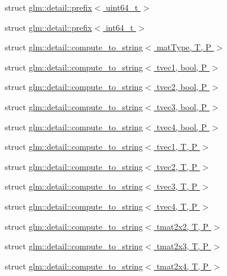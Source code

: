 \begin{DoxyCompactItemize}
struct \hyperlink{structglm_1_1detail_1_1prefix_3_01uint64__t_01_4}{glm\-::detail\-::prefix$<$ uint64\-\_\-t $>$}
\item 
struct \hyperlink{structglm_1_1detail_1_1prefix_3_01int64__t_01_4}{glm\-::detail\-::prefix$<$ int64\-\_\-t $>$}
\item 
struct \hyperlink{structglm_1_1detail_1_1compute__to__string}{glm\-::detail\-::compute\-\_\-to\-\_\-string$<$ mat\-Type, T, P $>$}
\item 
struct \hyperlink{structglm_1_1detail_1_1compute__to__string_3_01tvec1_00_01bool_00_01P_01_4}{glm\-::detail\-::compute\-\_\-to\-\_\-string$<$ tvec1, bool, P $>$}
\item 
struct \hyperlink{structglm_1_1detail_1_1compute__to__string_3_01tvec2_00_01bool_00_01P_01_4}{glm\-::detail\-::compute\-\_\-to\-\_\-string$<$ tvec2, bool, P $>$}
\item 
struct \hyperlink{structglm_1_1detail_1_1compute__to__string_3_01tvec3_00_01bool_00_01P_01_4}{glm\-::detail\-::compute\-\_\-to\-\_\-string$<$ tvec3, bool, P $>$}
\item 
struct \hyperlink{structglm_1_1detail_1_1compute__to__string_3_01tvec4_00_01bool_00_01P_01_4}{glm\-::detail\-::compute\-\_\-to\-\_\-string$<$ tvec4, bool, P $>$}
\item 
struct \hyperlink{structglm_1_1detail_1_1compute__to__string_3_01tvec1_00_01T_00_01P_01_4}{glm\-::detail\-::compute\-\_\-to\-\_\-string$<$ tvec1, T, P $>$}
\item 
struct \hyperlink{structglm_1_1detail_1_1compute__to__string_3_01tvec2_00_01T_00_01P_01_4}{glm\-::detail\-::compute\-\_\-to\-\_\-string$<$ tvec2, T, P $>$}
\item 
struct \hyperlink{structglm_1_1detail_1_1compute__to__string_3_01tvec3_00_01T_00_01P_01_4}{glm\-::detail\-::compute\-\_\-to\-\_\-string$<$ tvec3, T, P $>$}
\item 
struct \hyperlink{structglm_1_1detail_1_1compute__to__string_3_01tvec4_00_01T_00_01P_01_4}{glm\-::detail\-::compute\-\_\-to\-\_\-string$<$ tvec4, T, P $>$}
\item 
struct \hyperlink{structglm_1_1detail_1_1compute__to__string_3_01tmat2x2_00_01T_00_01P_01_4}{glm\-::detail\-::compute\-\_\-to\-\_\-string$<$ tmat2x2, T, P $>$}
\item 
struct \hyperlink{structglm_1_1detail_1_1compute__to__string_3_01tmat2x3_00_01T_00_01P_01_4}{glm\-::detail\-::compute\-\_\-to\-\_\-string$<$ tmat2x3, T, P $>$}
\item 
struct \hyperlink{structglm_1_1detail_1_1compute__to__string_3_01tmat2x4_00_01T_00_01P_01_4}{glm\-::detail\-::compute\-\_\-to\-\_\-string$<$ tmat2x4, T, P $>$}

\end{DoxyCompactItemize}
